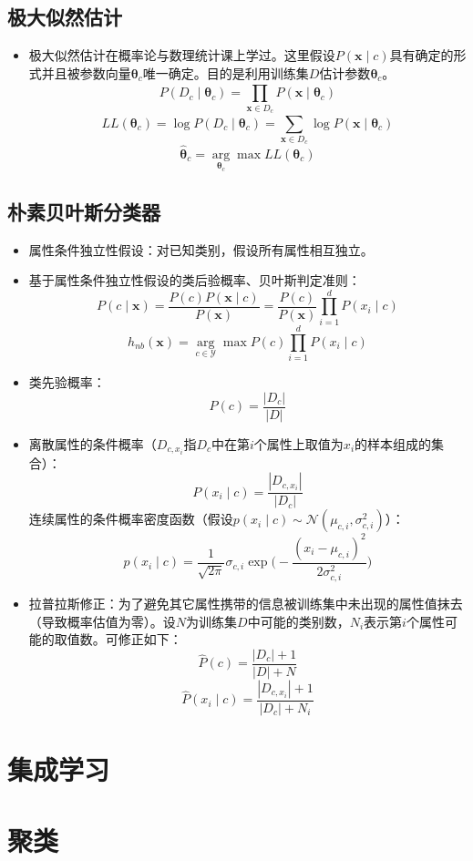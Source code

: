 \documentclass{ctexart}
\begin{document}
				\subsection{极大似然估计}
					\begin{itemize}
						\item 极大似然估计在概率论与数理统计课上学过。这里假设$P(\bm{x}\mid c)$具有确定的形式并且被参数向量$\bm{\theta}_c$唯一确定。目的是利用训练集$D$估计参数$\bm{\theta}_c$。\[P(D_c\mid\bm{\theta}_c)=\prod_{\bm{x}\in D_c}^{}P(\bm{x}\mid\bm{\theta}_c)\]\[LL(\bm{\theta}_c)=\log P(D_c\mid\bm{\theta}_c)=\sum_{\bm{x}\in D_c}^{}\log P(\bm{x}\mid\bm{\theta}_c)\]\[\hat{\bm{\theta}}_c=\arg\limits_{\bm{\theta}_c}\max LL(\bm{\theta}_c)\]
					\end{itemize}
				\subsection{朴素贝叶斯分类器}
					\begin{itemize}
						\item 属性条件独立性假设：对已知类别，假设所有属性相互独立。
						\item 基于属性条件独立性假设的类后验概率、贝叶斯判定准则：\[P(c\mid\bm{x})=\frac{P(c)P(\bm{x}\mid c)}{P(\bm{x})}=\frac{P(c)}{P(\bm{x})}\prod_{i=1}^{d}P(x_i\mid c)\]\[h_{nb}(\bm{x})=\arg\limits_{c\in\mathcal{Y}}\max P(c)\prod_{i=1}^{d}P(x_i\mid c)\]
						\item 类先验概率：\[P(c)=\frac{|D_c|}{|D|}\]
						\item 离散属性的条件概率（$D_{c,x_i}$指$D_c$中在第$i$个属性上取值为$x_i$的样本组成的集合）：\[P(x_i\mid c)=\frac{|D_{c,x_i}|}{|D_c|}\]连续属性的条件概率密度函数（假设$p(x_i\mid c)\sim\mathcal{N}(\mu_{c,i},\sigma_{c,i}^2)$）：\[p(x_i\mid c)=\frac{1}{\sqrt{2\pi}}\sigma_{c,i}\exp\bigg(-\frac{(x_i-\mu_{c,i})^2}{2\sigma_{c,i}^2}\bigg)\]
						\item 拉普拉斯修正：为了避免其它属性携带的信息被训练集中未出现的属性值抹去（导致概率估值为零）。设$N$为训练集$D$中可能的类别数，$N_i$表示第$i$个属性可能的取值数。可修正如下：\[\hat{P}(c)=\frac{|D_c|+1}{|D|+N}\]\[\hat{P}(x_i\mid c)=\frac{|D_{c,x_i}|+1}{|D_c|+N_i}\]
					\end{itemize}
			\section{集成学习}
			\section{聚类}
\end{document}
